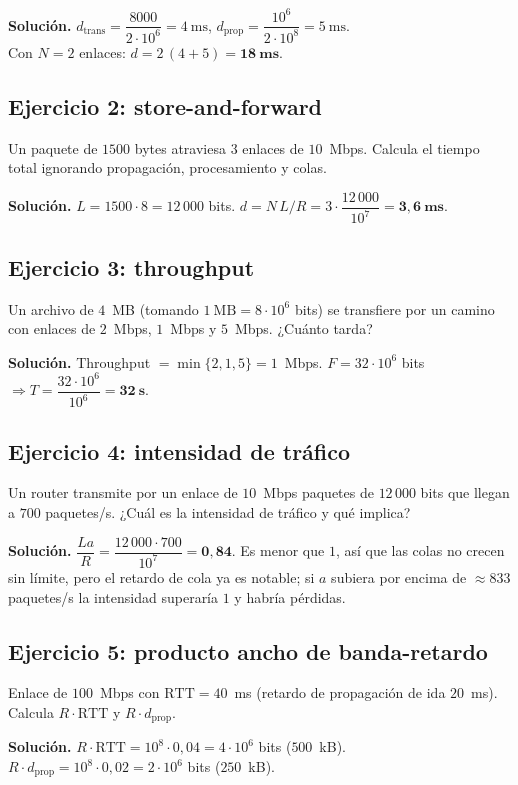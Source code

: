\documentclass[11pt,a4paper]{article}
\begin{document}
\textbf{Solución.}
$d_{\text{trans}} = \dfrac{8000}{2\cdot10^{6}} = 4~\text{ms}$,
\quad $d_{\text{prop}} = \dfrac{10^{6}}{2\cdot10^{8}} = 5~\text{ms}$.\\
Con $N=2$ enlaces: $d = 2\,(4+5) = \mathbf{18~ms}$.

\subsection*{Ejercicio 2: store-and-forward}
Un paquete de $1500$ bytes atraviesa $3$ enlaces de $10$~Mbps. Calcula el tiempo total ignorando propagación, procesamiento y colas.

\textbf{Solución.} $L=1500\cdot8=12\,000$ bits. $d = N\,L/R = 3\cdot\dfrac{12\,000}{10^{7}} = \mathbf{3{,}6~ms}$.

\subsection*{Ejercicio 3: throughput}
Un archivo de $4$~MB (tomando $1~\text{MB}=8\cdot10^{6}$ bits) se transfiere por un camino con enlaces de $2$~Mbps, $1$~Mbps y $5$~Mbps. ¿Cuánto tarda?

\textbf{Solución.} Throughput $=\min\{2,1,5\}=1$~Mbps. $F=32\cdot10^{6}$ bits $\Rightarrow T=\dfrac{32\cdot10^{6}}{10^{6}}=\mathbf{32~s}$.

\subsection*{Ejercicio 4: intensidad de tráfico}
Un router transmite por un enlace de $10$~Mbps paquetes de $12\,000$ bits que llegan a $700$ paquetes/s. ¿Cuál es la intensidad de tráfico y qué implica?

\textbf{Solución.} $\dfrac{La}{R}=\dfrac{12\,000\cdot700}{10^{7}}=\mathbf{0{,}84}$. Es menor que $1$, así que las colas no crecen sin límite, pero el retardo de cola ya es notable; si $a$ subiera por encima de $\approx833$ paquetes/s la intensidad superaría $1$ y habría pérdidas.

\subsection*{Ejercicio 5: producto ancho de banda-retardo}
Enlace de $100$~Mbps con $\text{RTT}=40$~ms (retardo de propagación de ida $20$~ms). Calcula $R\cdot\text{RTT}$ y $R\cdot d_{\text{prop}}$.

\textbf{Solución.} $R\cdot\text{RTT}=10^{8}\cdot0{,}04=4\cdot10^{6}$ bits ($500$~kB). $R\cdot d_{\text{prop}}=10^{8}\cdot0{,}02=2\cdot10^{6}$ bits ($250$~kB).
\end{document}
